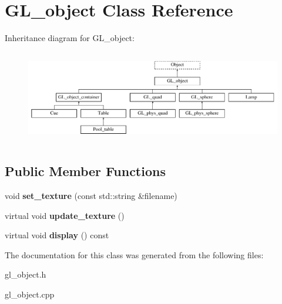 \hypertarget{class_g_l__object}{
\section{GL\_\-object Class Reference}
\label{class_g_l__object}
}
Inheritance diagram for GL\_\-object:\begin{figure}[H]
\begin{center}
\leavevmode
\includegraphics[height=4.087591cm]{class_g_l__object}
\end{center}
\end{figure}
\subsection*{Public Member Functions}
\begin{DoxyCompactItemize}
\item 
\hypertarget{class_g_l__object_a5853339a678c64cef5c87b4564f53212}{
void {\bfseries set\_\-texture} (const std::string \&filename)}
\label{class_g_l__object_a5853339a678c64cef5c87b4564f53212}

\item 
\hypertarget{class_g_l__object_a245673a6299c4b8208b77a71803f8020}{
virtual void {\bfseries update\_\-texture} ()}
\label{class_g_l__object_a245673a6299c4b8208b77a71803f8020}

\item 
\hypertarget{class_g_l__object_a73e95ea9fe0079e11e5801cd248f8ebc}{
virtual void {\bfseries display} () const }
\label{class_g_l__object_a73e95ea9fe0079e11e5801cd248f8ebc}

\end{DoxyCompactItemize}


The documentation for this class was generated from the following files:\begin{DoxyCompactItemize}
\item 
gl\_\-object.h\item 
gl\_\-object.cpp\end{DoxyCompactItemize}
